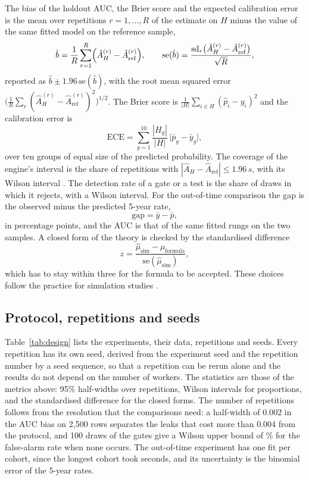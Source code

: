 The bias of the holdout AUC, the Brier score and the expected calibration error is the mean over repetitions $r=1,\dots,R$ of the estimate on $H$ minus the value of the same fitted model on the reference sample,
\begin{equation}
\hat b=\frac1R\sum_{r=1}^R\Bigl(\hat A_H^{(r)}-\hat A_{\mathrm{ref}}^{(r)}\Bigr),\qquad
\mathrm{se}(\hat b)=\frac{\mathrm{sd}_r\bigl(\hat A_H^{(r)}-\hat A_{\mathrm{ref}}^{(r)}\bigr)}{\sqrt R},
\label{eq:biashat}
\end{equation}
reported as $\hat b\pm1.96\,\mathrm{se}(\hat b)$, with the root mean squared error $\bigl(\frac1R\sum_r(\hat A_H^{(r)}-\hat A_{\mathrm{ref}}^{(r)})^2\bigr)^{1/2}$. The Brier score is $\frac1{|H|}\sum_{i\in H}(\hat p_i-y_i)^2$ and the calibration error is
\begin{equation}
\mathrm{ECE}=\sum_{g=1}^{10}\frac{|H_g|}{|H|}\,\bigl|\bar p_g-\bar y_g\bigr|,
\label{eq:ece}
\end{equation}
over ten groups of equal size of the predicted probability. The coverage of the engine's interval is the share of repetitions with $|\hat A_H-\hat A_{\mathrm{ref}}|\le1.96\,s$, with its Wilson interval \citep{brown2001}. The detection rate of a gate or a test is the share of draws in which it rejects, with a Wilson interval. For the out-of-time comparison the gap is the observed minus the predicted 5-year rate,
\begin{equation}
\mathrm{gap}=\bar y-\bar p,
\label{eq:gap}
\end{equation}
in percentage points, and the AUC is that of the same fitted rungs on the two samples. A closed form of the theory is checked by the standardised difference
\begin{equation}
z=\frac{\hat\mu_{\mathrm{sim}}-\mu_{\mathrm{formula}}}{\mathrm{se}(\hat\mu_{\mathrm{sim}})},
\label{eq:zscore}
\end{equation}
which has to stay within three for the formula to be accepted. These choices follow the practice for simulation studies \citep{morris2019}.

\subsection{Protocol, repetitions and seeds}

Table~\ref{tab:design} lists the experiments, their data, repetitions and seeds. Every repetition has its own seed, derived from the experiment seed and the repetition number by a seed sequence, so that a repetition can be rerun alone and the results do not depend on the number of workers. The statistics are those of the metrics above: 95\% half-widths over repetitions, Wilson intervals for proportions, and the standardised difference for the closed forms. The number of repetitions follows from the resolution that the comparisons need: a half-width of 0.002 in the AUC bias on 2,500 rows separates the leaks that cost more than 0.004 from the protocol, and 100 draws of the gates give a Wilson upper bound of \% for the false-alarm rate when none occurs. The out-of-time experiment has one fit per cohort, since the longest cohort took  seconds, and its uncertainty is the binomial error of the 5-year rates.

